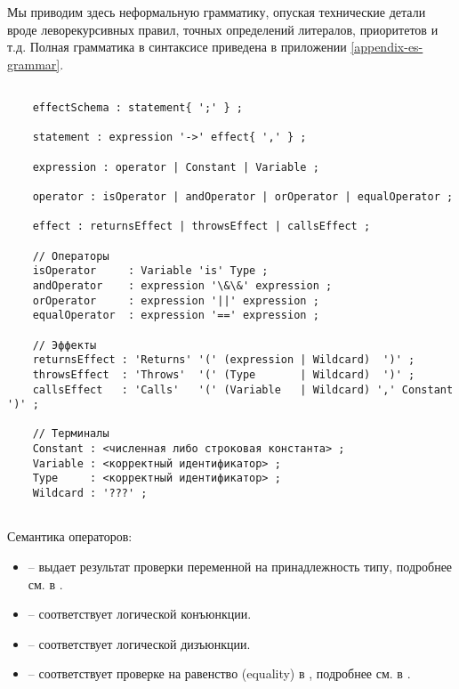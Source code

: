 Мы приводим здесь неформальную грамматику, опуская технические детали вроде леворекурсивных правил, точных определений литералов, приоритетов и т.д.  Полная грамматика в синтаксисе  приведена в приложении \ref{appendix-es-grammar}.


\begin{verbatim}

    effectSchema : statement{ ';' } ;
    
    statement : expression '->' effect{ ',' } ;
    
    expression : operator | Constant | Variable ;
    
    operator : isOperator | andOperator | orOperator | equalOperator ;
    
    effect : returnsEffect | throwsEffect | callsEffect ;
      
    // Операторы
    isOperator     : Variable 'is' Type ;
    andOperator    : expression '\&\&' expression ;
    orOperator     : expression '||' expression ;
    equalOperator  : expression '==' expression ;
    
    // Эффекты
    returnsEffect : 'Returns' '(' (expression | Wildcard)  ')' ;
    throwsEffect  : 'Throws'  '(' (Type       | Wildcard)  ')' ;
    callsEffect   : 'Calls'   '(' (Variable   | Wildcard) ',' Constant ')' ;
    
    // Терминалы
    Constant : <численная либо строковая константа> ; 
    Variable : <корректный идентификатор> ;        
    Type     : <корректный идентификатор> ;
    Wildcard : '???' ;
    
\end{verbatim}

Семантика операторов:

\begin{itemize}
    \item {} -- выдает результат проверки переменной на принадлежность типу, подробнее см. в \cite{kotlin:typechecks}.
    
    \item {} -- соответствует логической конъюнкции.
    
    \item {} -- соответствует логической дизъюнкции.
    
    \item {} -- соответствует проверке на равенство (equality) в , подробнее см. в \cite{kotlin:equality}.
\end{itemize}

